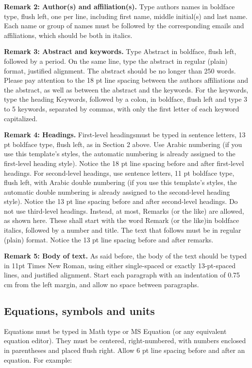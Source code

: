 \documentclass{cilamce19}
\begin{document}
\textbf{Remark 2: Author(s) and affiliation(s).} Type authors names in boldface type, flush left, one per line, including first name, middle initial(s) and last name. Each name or group of names must be followed by the corresponding emails and affiliations, which should be both in italics.

\textbf{Remark 3: Abstract and keywords.} Type Abstract in boldface, flush left, followed by a period. On the same line, type the abstract in regular (plain) format, justified alignment. The abstract should be no longer than 250 words. Please pay attention to the 18 pt line spacing between the authors affiliations and the abstract, as well as between the abstract and the keywords. For the keywords, type the heading Keywords, followed by a colon, in boldface, flush left and type 3 to 5 keywords, separated by commas, with only the first letter of each keyword capitalized.

\textbf{Remark 4: Headings.} First-level headingsmust be typed in sentence letters, 13 pt boldface type, flush left, as in Section 2 above. Use Arabic numbering (if you use this template's styles, the automatic numbering is already assigned to the first-level heading style). Notice the 18 pt line spacing before and after first-level headings. For second-level headings, use sentence letters, 11 pt boldface type, flush left, with Arabic double numbering (if you use this template's styles, the automatic double numbering is already assigned to the second-level heading style). Notice the 13 pt line spacing before and after second-level headings. Do not use third-level headings. Instead, at most, Remarks (or the like) are allowed, as shown here. These shall start with the word Remark (or the like)in boldface italics, followed by a number and title. The text that follows must be in regular (plain) format. Notice the 13 pt line spacing before and after remarks.

\textbf{Remark 5: Body of text.} As said before, the body of the text should be typed in 11pt Times New Roman, using either single-spaced or exactly 13-pt-spaced lines, and justified alignment. Start each paragraph with an indentation of 0.75 cm from the left margin, and allow no space between paragraphs. 


\subsection{Equations, symbols and units} 
Equations must be typed in Math type or MS Equation (or any equivalent equation editor). They must be centered, right-numbered, with numbers enclosed in parentheses and placed flush right. Allow 6 pt line spacing before and after an equation. For example:
\end{document}
